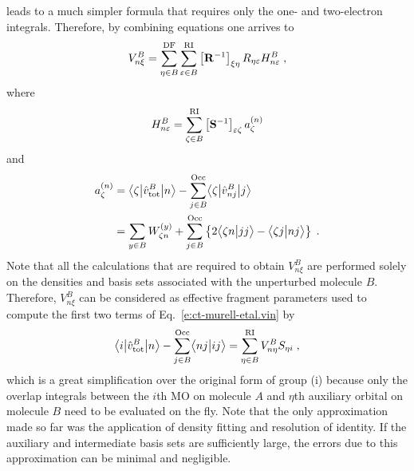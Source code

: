 %
leads to a much simpler formula
that requires only the one- and two\hyp{}electron integrals. 
Therefore, by combining
equations %
one arrives to
%
\begin{equation}
 V^B_{n\xi} = \sum_{\eta\in B}^{\rm DF} 
          \sum_{\varepsilon\in B}^{\rm RI}
         \left[ {\bf R}^{-1} \right]_{\xi\eta}
         R_{\eta \varepsilon} 
         H_{n\varepsilon}^B \;,
\end{equation}
%
where
%
\begin{equation}
 H_{n\varepsilon}^B = \sum_{\zeta\in B}^{\rm RI} \left[ {\bf S}^{-1} \right]_{\varepsilon\zeta}
   a_\zeta^{(n)}
\end{equation}
%
and
\begin{align}
 a^{(n)}_\zeta &= \bigl\langle {\zeta} \bigl\lvert {\hat{v}^B_{\rm tot}} \bigl\lvert {n} \bigr\rangle
      - \sum_{j\in B}^{\rm Occ} \bigl\langle {\zeta} \bigl\lvert {\hat{v}^B_{nj}} \bigl\lvert {j} \bigr\rangle \nonumber \\
 &= \sum_{y\in B} W^{(y)}_{\zeta n} 
  + \sum_{j\in B}^{\rm Occ} 
  \left\{
   2\bigl\langle {\zeta n} \bigl\lvert {jj} \bigr\rangle - \bigl\langle {\zeta j} \bigl\lvert {nj} \bigr\rangle 
  \right\} \;.
\end{align}
%
Note that all the calculations that are required to obtain $V^B_{n\xi}$ are performed
solely on the densities and basis sets associated with the unperturbed molecule $B$.
Therefore, $V^B_{n\xi}$ can be considered as effective fragment parameters
used to compute the first two terms of Eq.~\eqref{e:ct-murell-etal.vin} by
%
\begin{equation}
        \bigl\langle {i} \bigl\lvert {\hat{v}^B_{\rm tot} } \bigl\lvert {n} \bigr\rangle 
      - \sum_{j\in B}^{\rm Occ} \bigl\langle {nj} \bigl\lvert {ij} \bigr\rangle 
       = \sum_{\eta\in B}^{\rm RI} V^B_{n\eta} S_{\eta i} \;,
\end{equation}
%
which is a great simplification over the original form of group (i)
because only the overlap integrals between the $i$th MO on molecule $A$
and $\eta$th auxiliary orbital on molecule $B$ need to be evaluated on the fly.
Note that the only approximation made so far was the application of density fitting
and resolution of identity. If the auxiliary and intermediate
basis sets are sufficiently large, the errors
due to this approximation can be minimal and negligible.



